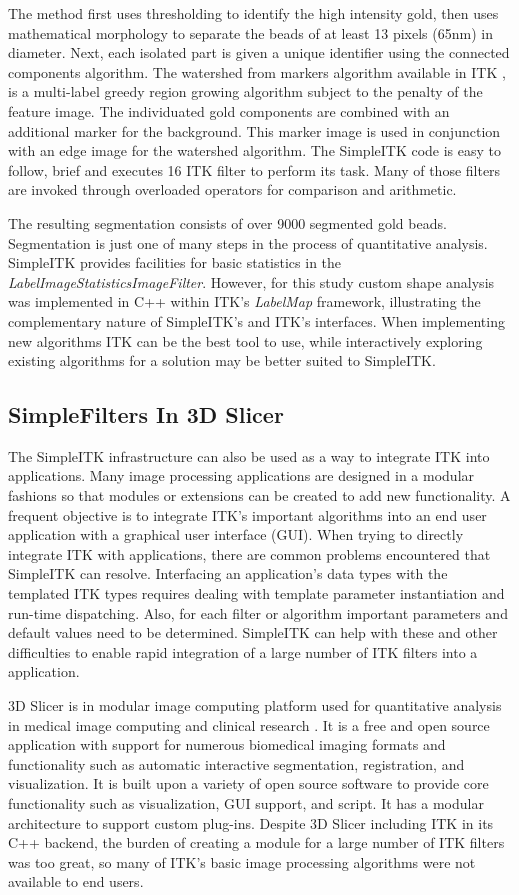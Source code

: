 \documentclass{frontiersMED} %
\begin{document}
The method first uses thresholding to identify the high intensity gold,
then uses mathematical morphology to separate the beads of at least 13 pixels
(65nm) in diameter. Next, each isolated part is given a unique
identifier using the connected components algorithm. The watershed from
markers algorithm available in ITK \cite{Beare2006}, is
a multi-label greedy region growing algorithm subject to the penalty of the
feature image. The individuated gold components are combined with an
additional marker for the background. This marker image is used in
conjunction with an edge image for the watershed algorithm. The
SimpleITK code is easy to follow, brief and executes 16 ITK filter
to perform its task. Many of those filters are invoked through
overloaded operators for comparison and arithmetic.

The resulting segmentation consists of over 9000 segmented gold
beads. Segmentation is just one of many steps in the process of
quantitative analysis. SimpleITK provides facilities for basic
statistics in the \textit{LabelImageStatisticsImageFilter}. However, for this
study custom shape analysis was implemented in C++
within ITK's \textit{LabelMap} framework, illustrating the complementary
nature of SimpleITK's and ITK's interfaces. When implementing new
algorithms ITK can be the best tool to use, while interactively
exploring existing algorithms for a solution may be better suited to
SimpleITK.

\subsection{SimpleFilters In 3D Slicer}
The SimpleITK infrastructure can also be used as a way to integrate
ITK into applications. Many image processing applications are designed
in a modular fashions so that modules or extensions can be created to
add new functionality. A frequent objective is to integrate ITK's
important algorithms into an end user application with a graphical
user interface (GUI). When trying to directly integrate ITK with
applications, there are common problems encountered that SimpleITK can
resolve. Interfacing an application's data types with
the templated ITK types requires dealing with template parameter
instantiation and run-time dispatching. Also, for each filter or algorithm
important parameters and default values need to be
determined. SimpleITK can help with these and other difficulties to
enable rapid integration of a large number of ITK filters into a
application.

3D Slicer is in modular image computing platform used for quantitative
analysis in medical image computing and clinical research
\cite{Fedorov2012}. It is a free and open source application with support
for numerous biomedical imaging formats and functionality such as
automatic interactive segmentation, registration, and
visualization. It is built upon a variety of open source software
to provide core functionality such as visualization, GUI
support, and script. It has a modular
architecture to support custom plug-ins. Despite 3D Slicer including ITK
in its C++ backend, the burden of creating a module for a large number of ITK
filters was too great, so many of ITK's basic image processing algorithms
were not available to end users.
\end{document}
